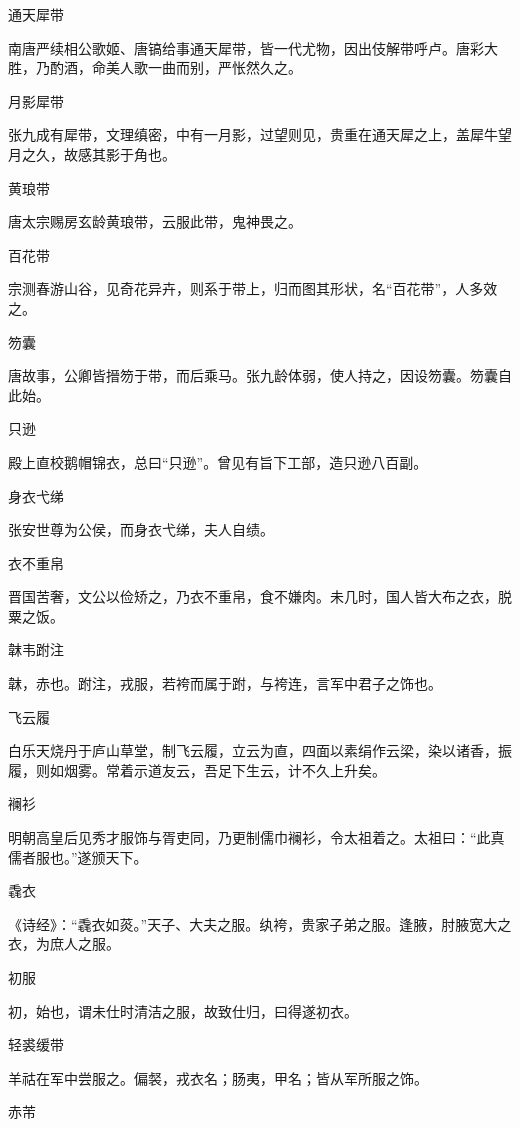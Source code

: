 \documentclass[a4paper,12pt,UTF8,twoside]{ctexbook}
\begin{document}
    通天犀带
    
    南唐严续相公歌姬、唐镐给事通天犀带，皆一代尤物，因出伎解带呼卢。唐彩大胜，乃酌酒，命美人歌一曲而别，严怅然久之。
    
    月影犀带
    
    张九成有犀带，文理缜密，中有一月影，过望则见，贵重在通天犀之上，盖犀牛望月之久，故感其影于角也。
    
    黄琅带
    
    唐太宗赐房玄龄黄琅带，云服此带，鬼神畏之。
    
    百花带
    
    宗测春游山谷，见奇花异卉，则系于带上，归而图其形状，名“百花带”，人多效之。
    
    笏囊
    
    唐故事，公卿皆搢笏于带，而后乘马。张九龄体弱，使人持之，因设笏囊。笏囊自此始。
    
    只逊
    
    殿上直校鹅帽锦衣，总曰“只逊”。曾见有旨下工部，造只逊八百副。
    
    身衣弋绨
    
    张安世尊为公侯，而身衣弋绨，夫人自绩。
    
    衣不重帛
    
    晋国苦奢，文公以俭矫之，乃衣不重帛，食不嫌肉。未几时，国人皆大布之衣，脱粟之饭。
    
    韎韦跗注
    
    韎，赤也。跗注，戎服，若袴而属于跗，与袴连，言军中君子之饰也。
    
    飞云履
    
    白乐天烧丹于庐山草堂，制飞云履，立云为直，四面以素绢作云梁，染以诸香，振履，则如烟雾。常着示道友云，吾足下生云，计不久上升矣。
    
    襕衫
    
    明朝高皇后见秀才服饰与胥吏同，乃更制儒巾襕衫，令太祖着之。太祖曰：“此真儒者服也。”遂颁天下。
    
    毳衣
    
    《诗经》：“毳衣如菼。”天子、大夫之服。纨袴，贵家子弟之服。逢腋，肘腋宽大之衣，为庶人之服。
    
    初服
    
    初，始也，谓未仕时清洁之服，故致仕归，曰得遂初衣。
    
    轻裘缓带
    
    羊祜在军中尝服之。偏裻，戎衣名；肠夷，甲名；皆从军所服之饰。
    
    赤芾
    
\end{document}
